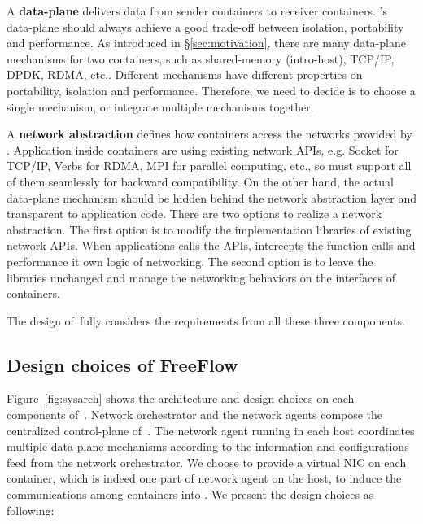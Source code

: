 A \textbf{data-plane} delivers data from sender containers to receiver 
containers. \sysname's data-plane should always achieve a good trade-off
between isolation, portability and performance. 
As introduced in \S\ref{sec:motivation}, there are many data-plane mechanisms
for two containers, such as shared-memory (intro-host), TCP/IP, DPDK, RDMA, etc..
Different mechanisms have different properties on portability, isolation and 
performance. Therefore, we need to decide is to choose a single mechanism, or
integrate multiple mechanisms together.

A \textbf{network abstraction} defines how containers access the networks
provided by \sysname. Application inside containers are using existing 
network APIs, e.g. Socket for TCP/IP, Verbs for RDMA, MPI for parallel computing, etc., so \sysname must support all of them seamlessly for 
backward compatibility. On the other hand, the actual data-plane mechanism
should be hidden behind the network abstraction layer and transparent to 
application code. There are two options to realize a network abstraction.
The first option is to modify the implementation libraries of existing
network APIs. When applications calls the APIs, \sysname intercepts
the function calls and performance it own logic of networking. 
The second option is to leave the libraries unchanged and manage the networking
behaviors on the interfaces of containers.

The design of~\sysname fully considers the requirements from all these three
components.

\subsection{Design choices of FreeFlow}

Figure~\ref{fig:sysarch} shows the architecture and design choices on each 
components of~\sysname. Network orchestrator and the network agents compose 
the centralized control-plane of~\sysname. The network agent running in each 
host coordinates multiple data-plane mechanisms according to the information and 
configurations feed from the network orchestrator. 
We choose to provide a virtual NIC on each container, which is indeed one part of network agent on the host, to induce the communications among containers 
into \sysname. We present the design choices as following:

